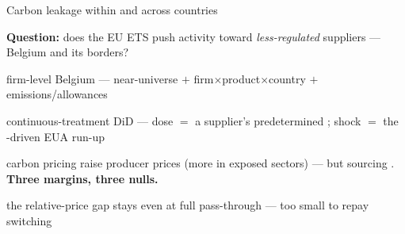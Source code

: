 
\begin{frame}{Carbon leakage within and across countries}

    \begin{tcolorbox}[colback=red!4,colframe=red!50!black]
        \textbf{Question:} does the EU ETS push activity toward \emph{less-regulated} suppliers ---
         Belgium and  its borders?
    \end{tcolorbox}

    \begin{wideitemize}
        \item \textbf{} firm-level Belgium --- near-universe  $+$ firm$\times$product$\times$country  $+$  emissions/allowances
        \item \textbf{} continuous-treatment DiD --- dose $=$ a supplier's predetermined ; shock $=$ the -driven EUA run-up
        \item \textbf{} carbon pricing  raise producer prices (more in exposed sectors) --- but sourcing . \textbf{Three margins, three nulls.}
        \item \textbf{} the relative-price gap stays  even at full pass-through --- too small to repay switching
    \end{wideitemize}

\end{frame}

